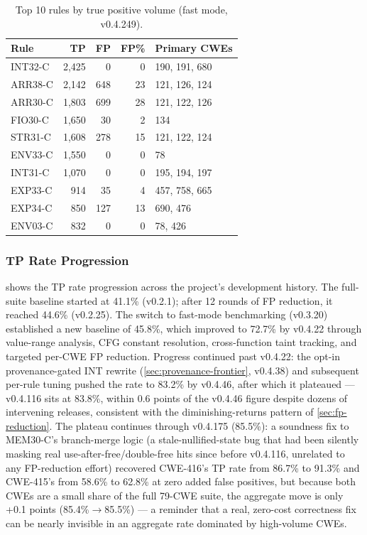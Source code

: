 \begin{table}[t]
\centering
\footnotesize
\begin{tabular}{@{}lrrrl@{}}
\toprule
\textbf{Rule} & \textbf{TP} & \textbf{FP} & \textbf{FP\%} & \textbf{Primary CWEs} \\
\midrule
INT32-C & 2,425 & 0    & 0  & 190, 191, 680 \\
ARR38-C & 2,142 & 648  & 23 & 121, 126, 124 \\
ARR30-C & 1,803 & 699  & 28 & 121, 122, 126 \\
FIO30-C & 1,650 & 30   & 2  & 134 \\
STR31-C & 1,608 & 278  & 15 & 121, 122, 124 \\
ENV33-C & 1,550 & 0    & 0  & 78 \\
INT31-C & 1,070 & 0    & 0  & 195, 194, 197 \\
EXP33-C & 914   & 35   & 4  & 457, 758, 665 \\
EXP34-C & 850   & 127  & 13 & 690, 476 \\
ENV03-C & 832   & 0    & 0  & 78, 426 \\
\bottomrule
\end{tabular}
\caption{Top 10 rules by true positive volume (fast mode, v0.4.249).}
\label{tab:top-rules}
\end{table}

\subsubsection{TP Rate Progression}

 shows the TP rate progression across
the project's development history.  The full-suite baseline started at
41.1\% (v0.2.1); after 12 rounds of FP reduction, it reached 44.6\%
(v0.2.25).  The switch to fast-mode benchmarking (v0.3.20) established
a new baseline of 45.8\%, which improved to 72.7\% by v0.4.22 through
value-range analysis, CFG constant resolution, cross-function taint
tracking, and targeted per-CWE FP reduction.  Progress continued past
v0.4.22: the opt-in provenance-gated INT rewrite
(\cref{sec:provenance-frontier}, v0.4.38) and subsequent per-rule
tuning pushed the rate to 83.2\% by v0.4.46, after which it plateaued
--- v0.4.116 sits at 83.8\%, within 0.6 points of the v0.4.46 figure
despite dozens of intervening releases, consistent with the
diminishing-returns pattern of \cref{sec:fp-reduction}. The plateau
continues through v0.4.175 (85.5\%): a soundness fix to MEM30-C's
branch-merge logic (a stale-nullified-state bug that had been
silently masking real use-after-free/double-free hits since before
v0.4.116, unrelated to any FP-reduction effort) recovered
CWE-416's TP rate from 86.7\% to 91.3\% and CWE-415's from 58.6\% to
62.8\% at zero added false positives, but because both CWEs are a
small share of the full 79-CWE suite, the aggregate move is only
+0.1 points (85.4\%$\to$85.5\%) --- a reminder that a real,
zero-cost correctness fix can be nearly invisible in an aggregate
rate dominated by high-volume CWEs.

